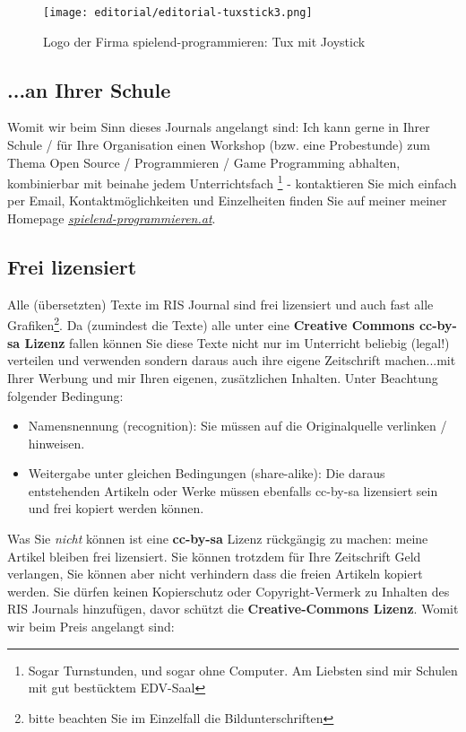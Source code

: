 \documentclass[10pt,a4paper,ngerman,twoside]{article} %
\begin{document}
\begin{figure}
\texttt{[image: editorial/editorial-tuxstick3.png]}\\
\caption{Logo der Firma spielend-programmieren: Tux mit Joystick}
\end{figure}

\subsection*{...an Ihrer Schule}
Womit wir beim Sinn dieses Journals angelangt sind: Ich kann gerne in Ihrer Schule / für Ihre Organisation einen Workshop (bzw. eine Probestunde) zum Thema Open Source / Programmieren / Game Programming abhalten, kombinierbar mit beinahe jedem Unterrichtsfach \footnote{Sogar Turnstunden, und sogar ohne Computer. Am Liebsten sind mir Schulen mit gut bestücktem EDV-Saal} - kontaktieren Sie mich einfach per Email, Kontaktmöglichkeiten und Einzelheiten finden Sie auf meiner  meiner Homepage \href{http://spielend-programmieren.at}{\textit{spielend-programmieren.at}}.


\subsection*{Frei lizensiert}
Alle (übersetzten) Texte im RIS Journal sind frei lizensiert und auch fast alle Grafiken\footnote{bitte beachten Sie im Einzelfall die Bildunterschriften}. Da (zumindest die Texte) alle unter eine \textbf{Creative Commons cc-by-sa Lizenz} fallen können Sie diese Texte nicht nur im Unterricht beliebig (legal!) verteilen und verwenden sondern daraus auch ihre eigene Zeitschrift machen...mit Ihrer Werbung und mir Ihren eigenen, zusätzlichen Inhalten. Unter Beachtung folgender Bedingung:
\begin{itemize} 
\item Namensnennung (recognition): Sie müssen auf die Originalquelle verlinken / hinweisen. 
\item Weitergabe unter gleichen Bedingungen (share-alike): Die daraus entstehenden Artikeln oder Werke müssen ebenfalls cc-by-sa lizensiert sein und frei kopiert werden können.
\end{itemize}
Was Sie \emph{nicht} können ist eine \textbf{cc-by-sa} Lizenz rückgängig zu machen: meine Artikel bleiben frei lizensiert. Sie können trotzdem für Ihre Zeitschrift Geld verlangen, Sie können aber nicht verhindern dass die freien Artikeln kopiert werden. Sie dürfen keinen  Kopierschutz oder Copyright-Vermerk zu Inhalten des RIS Journals hinzufügen, davor schützt die \textbf{Creative-Commons Lizenz}. Womit wir beim Preis angelangt sind:
\end{document}
